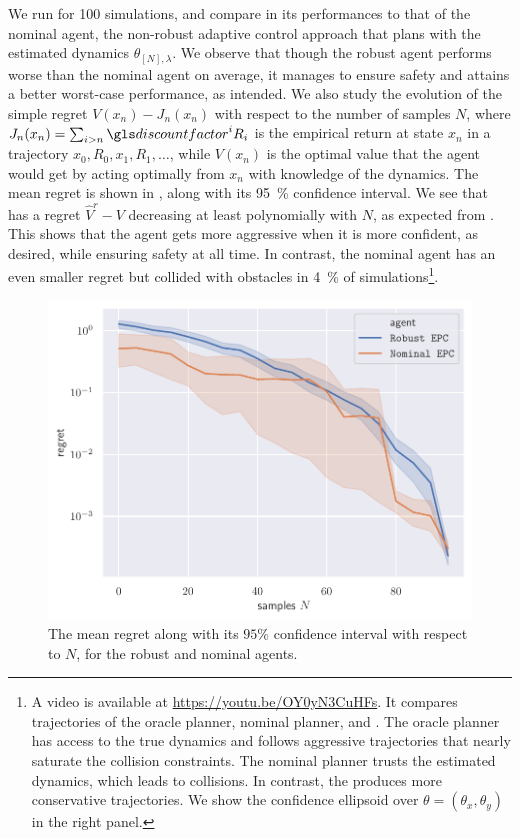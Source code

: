 We run  for 100 simulations, and compare in  its performances to that of the nominal agent, \ie the non-robust adaptive control approach that plans with the estimated dynamics $\theta_{[N],\lambda}$. We observe that though the robust agent performs worse than the nominal agent on average, it manages to ensure safety and attains a better worst-case performance, as intended. We also study the evolution of the simple regret $V(x_n) - J_n(x_n)$ with respect to the number of samples $N$, where $J_n(x_n) = \sum_{i > n} \discount^i R_i$ is the empirical return at state $x_n$ in a trajectory $x_0, R_0, x_1, R_1, \dots$, while $V(x_n)$ is the optimal value that the agent would get by acting optimally from $x_n$ with knowledge of the dynamics. The mean regret is shown in , along with its \SI{95}{\percent} confidence interval. We see that  has a regret $\hat{V}^r - V$ decreasing at least polynomially with $N$, as expected from . This shows that the agent gets more aggressive when it is more confident, as desired, while ensuring safety at all time. In contrast, the nominal agent has an even smaller regret but collided with obstacles in \SI{4}{\percent} of simulations\footnote{A video is available at \href{https://youtu.be/OY0yN3CuHFs}{https://youtu.be/OY0yN3CuHFs}. It compares trajectories of the oracle planner, nominal planner, and . The oracle planner has access to the true dynamics and follows aggressive trajectories that nearly saturate the collision constraints. The nominal planner trusts the estimated dynamics, which leads to collisions. In contrast, the  produces more conservative trajectories. We show the confidence ellipsoid over $\theta = (\theta_x,\theta_y)$ in the right panel.}.

\begin{figure}[tp]
	\centering
	\includegraphics[width=0.8\linewidth]{img/regret.pdf}
	\caption{The mean regret along with its $95\%$ confidence interval with respect to $N$, for the robust and nominal agents.}
	\label{fig:regret}
\end{figure}

